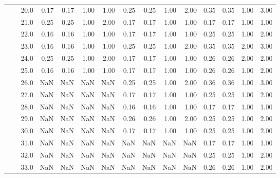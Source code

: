 \begin{tabular}{lllrrrrrrrrrrrr}
       &     & 20.0 &       0.17 &      0.17 & 1.00 &   1.00 &       0.25 &      0.25 &  1.00 &   2.00 &       0.35 &      0.35 &  1.00 &   3.00 \\
       &     & 21.0 &       0.25 &      0.25 & 1.00 &   2.00 &       0.17 &      0.17 &  1.00 &   1.00 &       0.17 &      0.17 &  1.00 &   1.00 \\
       &     & 22.0 &       0.16 &      0.16 & 1.00 &   1.00 &       0.17 &      0.17 &  1.00 &   1.00 &       0.25 &      0.25 &  1.00 &   2.00 \\
       &     & 23.0 &       0.16 &      0.16 & 1.00 &   1.00 &       0.25 &      0.25 &  1.00 &   2.00 &       0.35 &      0.35 &  2.00 &   3.00 \\
       &     & 24.0 &       0.25 &      0.25 & 1.00 &   2.00 &       0.17 &      0.17 &  1.00 &   1.00 &       0.26 &      0.26 &  2.00 &   2.00 \\
       &     & 25.0 &       0.16 &      0.16 & 1.00 &   1.00 &       0.17 &      0.17 &  1.00 &   1.00 &       0.26 &      0.26 &  1.00 &   2.00 \\
       &     & 26.0 &        NaN &       NaN &  NaN &    NaN &       0.25 &      0.25 &  1.00 &   2.00 &       0.36 &      0.36 &  1.00 &   3.00 \\
       &     & 27.0 &        NaN &       NaN &  NaN &    NaN &       0.17 &      0.17 &  1.00 &   1.00 &       0.25 &      0.25 &  1.00 &   2.00 \\
       &     & 28.0 &        NaN &       NaN &  NaN &    NaN &       0.16 &      0.16 &  1.00 &   1.00 &       0.17 &      0.17 &  1.00 &   1.00 \\
       &     & 29.0 &        NaN &       NaN &  NaN &    NaN &       0.26 &      0.26 &  1.00 &   2.00 &       0.25 &      0.25 &  1.00 &   2.00 \\
       &     & 30.0 &        NaN &       NaN &  NaN &    NaN &       0.17 &      0.17 &  1.00 &   1.00 &       0.25 &      0.25 &  1.00 &   2.00 \\
       &     & 31.0 &        NaN &       NaN &  NaN &    NaN &        NaN &       NaN &   NaN &    NaN &       0.17 &      0.17 &  1.00 &   1.00 \\
       &     & 32.0 &        NaN &       NaN &  NaN &    NaN &        NaN &       NaN &   NaN &    NaN &       0.25 &      0.25 &  1.00 &   2.00 \\
       &     & 33.0 &        NaN &       NaN &  NaN &    NaN &        NaN &       NaN &   NaN &    NaN &       0.26 &      0.26 &  1.00 &   2.00 \\

\end{tabular}
